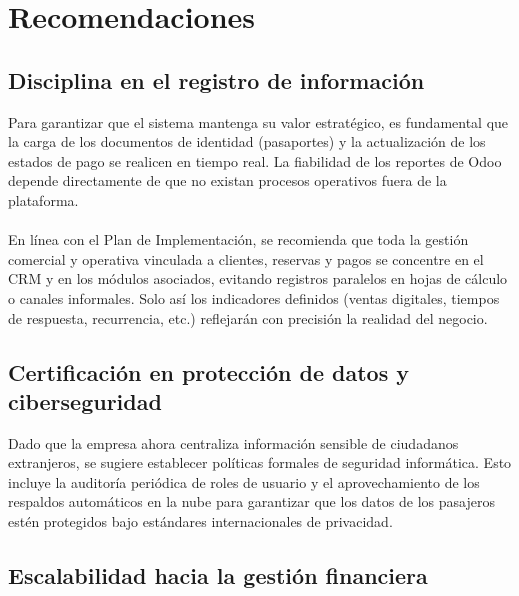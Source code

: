 \section{Recomendaciones}

\subsection{Disciplina en el registro de información}

\begin{indentedsubsection}
Para garantizar que el sistema mantenga su valor estratégico, es fundamental que la carga de los documentos de identidad (pasaportes) y la actualización de los estados de pago se realicen en tiempo real. La fiabilidad de los reportes de Odoo depende directamente de que no existan procesos operativos fuera de la plataforma.
\\
\\
En línea con el Plan de Implementación, se recomienda que toda la gestión comercial y operativa vinculada a clientes, reservas y pagos se concentre en el CRM y en los módulos asociados, evitando registros paralelos en hojas de cálculo o canales informales. Solo así los indicadores definidos (ventas digitales, tiempos de respuesta, recurrencia, etc.) reflejarán con precisión la realidad del negocio.

\end{indentedsubsection}

\subsection{Certificación en protección de datos y ciberseguridad}

\begin{indentedsubsection}
Dado que la empresa ahora centraliza información sensible de ciudadanos extranjeros, se sugiere establecer políticas formales de seguridad informática. Esto incluye la auditoría periódica de roles de usuario y el aprovechamiento de los respaldos automáticos en la nube para garantizar que los datos de los pasajeros estén protegidos bajo estándares internacionales de privacidad.

\end{indentedsubsection}

\subsection{Escalabilidad hacia la gestión financiera}

